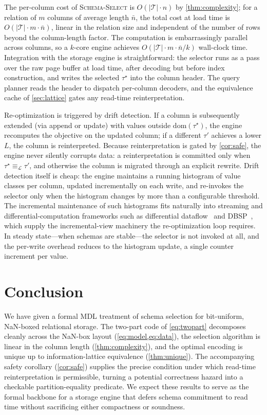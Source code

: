 \documentclass[10pt]{article}
\theoremstyle{definition}
\theoremstyle{remark}
\newcommand{\Tcal}{\mathcal{T}}
\newcommand{\eqL}{\equiv_{\mathcal{L}}}
\begin{document}
The per-column cost of \textsc{Schema-Select} is $O(|\Tcal| \cdot n)$ by
\cref{thm:complexity}; for a relation of $m$ columns of average length
$\bar n$, the total cost at load time is $O(|\Tcal| \cdot m \cdot \bar n)$,
linear in the relation size and independent of the number of rows beyond
the column-length factor. The computation is embarrassingly parallel
across columns, so a $k$-core engine achieves $O(|\Tcal| \cdot m \cdot
\bar n / k)$ wall-clock time. Integration with the storage engine is
straightforward: the selector runs as a pass over the raw page buffer at
load time, after decoding but before index construction, and writes the
selected $\tau^\star$ into the column header. The query planner reads the
header to dispatch per-column decoders, and the equivalence cache of
\cref{sec:lattice} gates any read-time reinterpretation.

Re-optimization is triggered by drift detection. If a column is
subsequently extended (via append or update) with values outside
$\mathrm{dom}(\tau^\star)$, the engine recomputes the objective on the
updated column; if a different $\tau'$ achieves a lower $L$, the column is
reinterpreted. Because reinterpretation is gated by
\cref{cor:safe}, the engine never silently corrupts data: a
reinterpretation is committed only when $\tau^\star \eqL \tau'$, and
otherwise the column is migrated through an explicit rewrite. Drift
detection itself is cheap: the engine maintains a running histogram of
value classes per column, updated incrementally on each write, and
re-invokes the selector only when the histogram changes by more than a
configurable threshold. The incremental maintenance of such histograms
fits naturally into streaming and differential-computation frameworks
such as differential dataflow~\citep{mcsherry2013} and
DBSP~\citep{budiu2023}, which supply the incremental-view machinery the
re-optimization loop requires. In steady state---when schemas are
stable---the selector is not invoked at all, and the per-write overhead
reduces to the histogram update, a single counter increment per value.

\section{Conclusion}\label{sec:concl}

We have given a formal MDL treatment of schema selection for bit-uniform,
NaN-boxed relational storage. The two-part code of \cref{eq:twopart}
decomposes cleanly across the NaN-box layout
(\cref{eq:model,eq:data}), the selection algorithm is linear in the
column length (\cref{thm:complexity}), and the optimal encoding is unique
up to information-lattice equivalence (\cref{thm:unique}). The
accompanying safety corollary (\cref{cor:safe}) supplies the precise
condition under which read-time reinterpretation is permissible, turning
a potential correctness hazard into a checkable partition-equality
predicate. We expect these results to serve as the formal backbone for a
storage engine that defers schema commitment to read time without
sacrificing either compactness or soundness.
\end{document}
